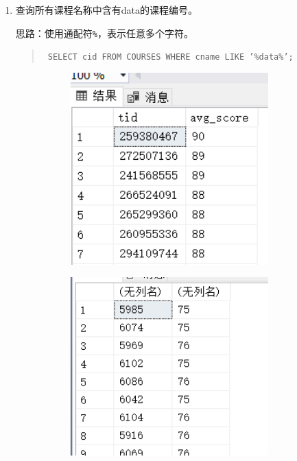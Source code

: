 \documentclass[a4paper,twoside]{article}
\begin{document}
\begin{spacing}{1.2}
\begin{enumerate}
\item 查询所有课程名称中含有data的课程编号。

思路：使用通配符\texttt{\%}，表示任意多个字符。
\begin{quote}
\texttt{
SELECT cid
FROM COURSES
WHERE cname LIKE '\%data\%';
}
\end{quote}


\begin{figure}[h]
\centering
\caption{运行结果}
\begin{subfigure}{0.3\textwidth}
  \includegraphics[width=0.9\textwidth]{fig7.png}
\end{subfigure}
\begin{subfigure}{0.3\textwidth}
  \includegraphics[width=0.9\textwidth]{fig8.png}
\end{subfigure}
\end{figure}



\end{enumerate}
\end{spacing}
\end{document}
